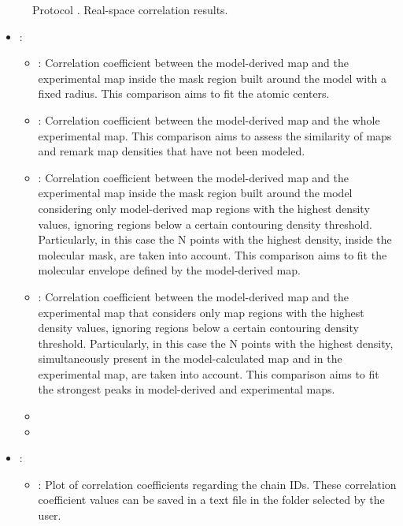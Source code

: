 \begin{itemize}
\begin{itemize}
\begin{figure}[H]
         \caption{Protocol . Real-space correlation results.}
         \label{fig:app_protocol_real_space_refine_4}
        \end{figure}
        \begin{itemize}
         \item {} \citep{afonine2018b}: 
         \begin{itemize}  
          \item {}: Correlation coefficient between the model-derived map and the experimental map inside the mask region built around the model with a fixed radius. This comparison aims to fit the atomic centers.
          \item {}: Correlation coefficient between the model-derived map and the whole experimental map. This comparison aims to assess the similarity of maps and remark map densities that have not been modeled.
          \item {}: Correlation coefficient between the model-derived map and the experimental map inside the mask region built around the model considering only model-derived map regions with the highest density values, ignoring regions below a certain contouring density threshold. Particularly, in this case the N points with the highest density, inside the molecular mask, are taken into account. This comparison aims to fit the molecular envelope defined by the model-derived map.
          \item {}: Correlation coefficient between the model-derived map and the experimental map that considers only map regions with the highest density values, ignoring regions below a certain contouring density threshold. Particularly, in this case the N points with the highest density, simultaneously present in the model-calculated map and in the experimental map, are taken into account. This comparison aims to fit the strongest peaks in model-derived and experimental maps.
          \item {}
          \item {}
         \end{itemize}
         \item {}:
         \begin{itemize}
           \item {}: Plot of correlation coefficients regarding the chain IDs. These correlation coefficient values can be saved in a text file in the folder selected by the user.

\end{itemize}
\end{itemize}
\end{itemize}
\end{itemize}
